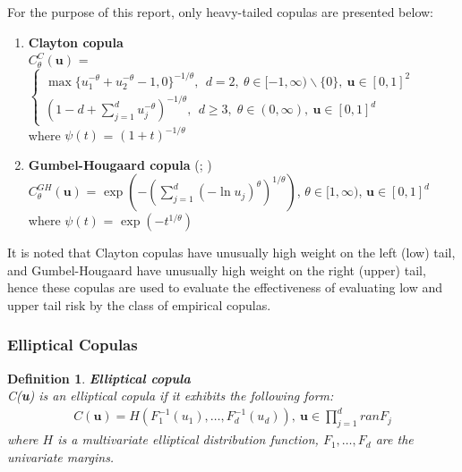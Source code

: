 \documentclass[12pt]{report}
\newtheorem{definition}{Definition}[subsection]
\newcommand{\1}{\mathbf{1}}
\begin{document}
For the purpose of this report, only heavy-tailed copulas are presented below:\\
\begin{enumerate}
\item \textbf{Clayton copula} \parencite{ClaytonCopula} \\
\vspace{0.5cm}
$C^{C}_{\theta}(\boldsymbol{u})$ = $\left\{
\begin{array}{ll} 
\max \{ u_{1}^{-\theta} + u_{2}^{-\theta} - 1, 0 \}^{-1/\theta}, \: \: d = 2, \: \theta \in [-1,\infty) \backslash \{ 0 \}, \: \boldsymbol{u} \in [0,1]^{2} \\
(1 - d + \sum_{j = 1}^{d} u^{- \theta}_{j} )^{-1/\theta}, \: \: d \ge 3, \; \theta \in (0,\infty), \: \boldsymbol{u} \in [0,1]^{d}
\end{array} 
\right.$ 
\\
\vspace{0.5cm}
where $\psi(t)$ = $(1 + t)^{-1/\theta}$ 

\item \textbf{Gumbel-Hougaard copula} (\cite{GumbelCopula}; \cite{HougaardCopula}) \\ 

\vspace{0.5cm}
$C^{GH}_{\theta}(\boldsymbol{u})$ = $\exp \left( -( \sum\limits_{j = 1}^{d} (- \ln u_{j})^{\theta})^{1/\theta} \right)$, $\theta \in [1,\infty) $, $\boldsymbol{u} \in [0,1]^{d}$ 
\\
\vspace{0.5cm}
where $\psi(t)$ = $\exp(-t^{1/\theta})$
\end{enumerate}

It is noted that Clayton copulas have unusually high weight on the left (low) tail, and Gumbel-Hougaard have unusually high weight on the right (upper) tail, hence these copulas are used to evaluate the effectiveness of evaluating low and upper tail risk by the class of empirical copulas. \\

\subsubsection{Elliptical Copulas}
\vspace{0.5cm}

\begin{definition}\label{EllipticalDefinition}
\textit{\normalfont\parencite{HofertBook}} \:\textbf{Elliptical copula} \\

C(\textbf{u}) is an elliptical copula if it exhibits the following form: \\
\vspace{-0.8cm}
\begin{align*}
C(\boldsymbol{u}) = H(F^{-1}_{1}(u_{1}), \dots, F^{-1}_{d}(u_{d})), \: \boldsymbol{u} \in \prod\limits_{j=1}^{d} ran F_{j}
\end{align*}
where $H$ is a multivariate elliptical distribution function, $F_{1}, \dots, F_{d}$ are the univariate margins.
\end{definition}
\end{document}
